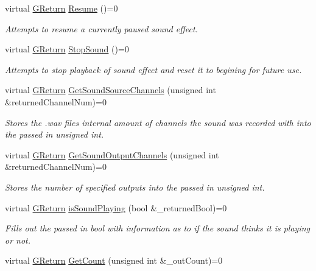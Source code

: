 \begin{DoxyCompactItemize}
virtual \hyperlink{namespaceGW_a67a839e3df7ea8a5c5686613a7a3de21}{G\+Return} \hyperlink{classGW_1_1AUDIO_1_1GSound_aae7e8c6cd723ba35d67e6c0ec2c4f794}{Resume} ()=0
\begin{DoxyCompactList}\small\item\em Attempts to resume a currently paused sound effect. \end{DoxyCompactList}\item 
virtual \hyperlink{namespaceGW_a67a839e3df7ea8a5c5686613a7a3de21}{G\+Return} \hyperlink{classGW_1_1AUDIO_1_1GSound_adb9e958fc6f853a37d0d84a7fcbe806c}{Stop\+Sound} ()=0
\begin{DoxyCompactList}\small\item\em Attempts to stop playback of sound effect and reset it to begining for future use. \end{DoxyCompactList}\item 
virtual \hyperlink{namespaceGW_a67a839e3df7ea8a5c5686613a7a3de21}{G\+Return} \hyperlink{classGW_1_1AUDIO_1_1GSound_acca8a7684851e32f4022006fd9eacf6c}{Get\+Sound\+Source\+Channels} (unsigned int \&returned\+Channel\+Num)=0
\begin{DoxyCompactList}\small\item\em Stores the .wav files internal amount of channels the sound was recorded with into the passed in unsigned int. \end{DoxyCompactList}\item 
virtual \hyperlink{namespaceGW_a67a839e3df7ea8a5c5686613a7a3de21}{G\+Return} \hyperlink{classGW_1_1AUDIO_1_1GSound_a9dcb3529b8819eedfd40e865a3bc611f}{Get\+Sound\+Output\+Channels} (unsigned int \&returned\+Channel\+Num)=0
\begin{DoxyCompactList}\small\item\em Stores the number of specified outputs into the passed in unsigned int. \end{DoxyCompactList}\item 
virtual \hyperlink{namespaceGW_a67a839e3df7ea8a5c5686613a7a3de21}{G\+Return} \hyperlink{classGW_1_1AUDIO_1_1GSound_a904241837e93254806b2518f7da24ba9}{is\+Sound\+Playing} (bool \&\+\_\+returned\+Bool)=0
\begin{DoxyCompactList}\small\item\em Fills out the passed in bool with information as to if the sound thinks it is playing or not. \end{DoxyCompactList}\item 
virtual \hyperlink{namespaceGW_a67a839e3df7ea8a5c5686613a7a3de21}{G\+Return} \hyperlink{classGW_1_1AUDIO_1_1GSound_afbac022010da2fc1a917ece2803a36a4}{Get\+Count} (unsigned int \&\+\_\+out\+Count)=0

\end{DoxyCompactItemize}
